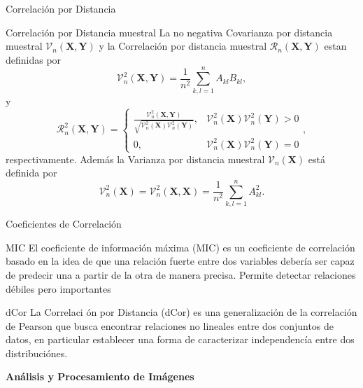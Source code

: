\documentclass{beamer}
\begin{document}
\begin{frame}{Correlaci\'on por Distancia}
        \begin{block}{Correlaci\'on por Distancia muestral}
            La no negativa Covarianza por distancia muestral $\mathcal{V}_n(\mathbf{X}, \mathbf{Y})$ y la Correlaci\'on por distancia muestral $\mathcal{R}_n(\mathbf{X}, \mathbf{Y})$ estan definidas por
            $$
            \mathcal{V}_n^2(\mathbf{X}, \mathbf{Y})=\frac{1}{n^2} \sum_{k, l=1}^n A_{k l} B_{k l},
            $$
            y
            $$
            \mathcal{R}_n^2(\mathbf{X}, \mathbf{Y})= \begin{cases}\frac{\mathcal{V}_n^2(\mathbf{X}, \mathbf{Y})}{\sqrt{\mathcal{V}_n^2(\mathbf{X}) \mathcal{V}_n^2(\mathbf{Y})}}, & \mathcal{V}_n^2(\mathbf{X}) \mathcal{V}_n^2(\mathbf{Y})>0 \\ 0, & \mathcal{V}_n^2(\mathbf{X}) \mathcal{V}_n^2(\mathbf{Y})=0\end{cases},
            $$
            respectivamente. Adem\'as la Varianza por distancia muestral $\mathcal{V}_n(\mathbf{X})$ est\'a definida por
            $$
            \mathcal{V}_n^2(\mathbf{X})=\mathcal{V}_n^2(\mathbf{X}, \mathbf{X})=\frac{1}{n^2} \sum_{k, l=1}^n A_{k l}^2 .
            $$
        \end{block}
\end{frame}

\begin{frame}{Coeficientes de Correlación}
    \begin{block}{MIC}
        El coeficiente de información máxima (MIC) es un coeficiente de correlación basado en la idea de que una relación fuerte entre dos variables debería ser capaz de predecir una a partir de la otra de manera precisa. Permite detectar relaciones débiles pero importantes
    \end{block}

    \begin{block}{dCor}
        La Correlaci	ón por Distancia (dCor) es una generalización de la correlación de Pearson que busca encontrar relaciones no lineales entre dos conjuntos de datos, en particular establecer una forma de caracterizar independencía entre dos distribuciónes.
    \end{block}
\end{frame}



\begin{frame}
    \begin{center}
        {\LARGE\bf Análisis y Procesamiento de Imágenes}
    \end{center}
\end{frame}
\end{document}
